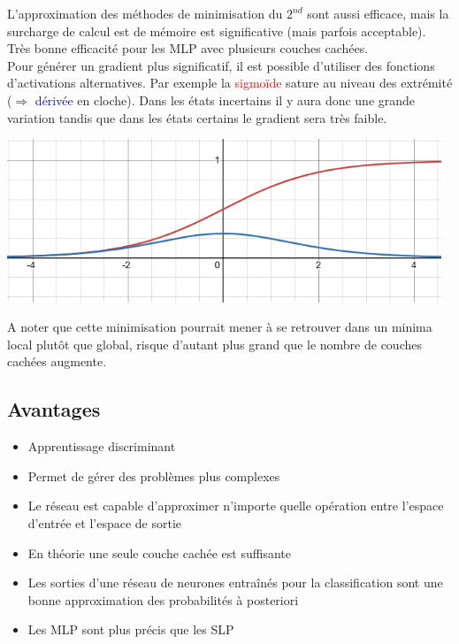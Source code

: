 \documentclass[a4paper,12pt,oneside]{report}	%
\begin{document}
        L'approximation des méthodes de minimisation du $2^{nd}$ sont aussi efficace, mais la surcharge de calcul est de mémoire est significative (mais parfois acceptable). \colorbox{bright-green}{Très bonne efficacité} \colorbox{bright-green}{pour les MLP avec plusieurs couches cachées.}\\
        Pour générer un gradient plus significatif, il est possible d'utiliser des fonctions d'activations alternatives. Par exemple la \textcolor{red}{sigmoïde} sature au niveau des extrémité ($\Rightarrow$ \textcolor{blue}{dérivée} en cloche). Dans les états incertains il y aura donc une grande variation tandis que dans les états certains le gradient sera très faible. \\
        \begin{center}
            \includegraphics[width=13cm]{LaTeX/pictures/3.4_1.png}
        \end{center}
        A noter que cette minimisation pourrait mener à se retrouver dans un minima local plutôt que global, risque d'autant plus grand que le nombre de couches cachées augmente.
        \subsection*{Avantages}
            \begin{itemize}
                \item Apprentissage discriminant
                \item Permet de gérer des problèmes plus complexes
                \item Le réseau est capable d'approximer n'importe quelle opération entre l'espace d'entrée et l'espace de sortie
                \item En théorie une seule couche cachée est suffisante
                \item Les sorties d'une réseau de neurones entraînés pour la classification sont une bonne approximation des probabilités à posteriori
                \item Les MLP sont plus précis que les SLP
            \end{itemize}
\end{document}
